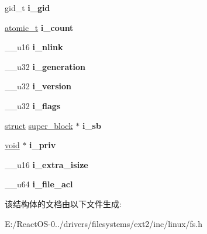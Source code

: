 \begin{DoxyCompactItemize}
\item 
\mbox{\label{structinode_a0c14ee3e0c6392287359562051162885}} 
gid\+\_\+t {\bfseries i\+\_\+gid}
\item 
\mbox{\label{structinode_acdca05fd469ccec646ecffff94ae65bd}} 
\hyperlink{structatomic__t}{atomic\+\_\+t} {\bfseries i\+\_\+count}
\item 
\mbox{\label{structinode_a9342b1b8e60aca78b8ab8a8c99d9259f}} 
\+\_\+\+\_\+u16 {\bfseries i\+\_\+nlink}
\item 
\mbox{\label{structinode_af1c7a9d8594e6a114ab81e265ba8cfa4}} 
\+\_\+\+\_\+u32 {\bfseries i\+\_\+generation}
\item 
\mbox{\label{structinode_a13316e21f7e5f12b934f45e46aa0cf1f}} 
\+\_\+\+\_\+u32 {\bfseries i\+\_\+version}
\item 
\mbox{\label{structinode_a5a6435f6deeed19d84c798ac239293f1}} 
\+\_\+\+\_\+u32 {\bfseries i\+\_\+flags}
\item 
\mbox{\label{structinode_a8e3ca37fd8f709720380afd9f60d0e71}} 
\hyperlink{interfacestruct}{struct} \hyperlink{structsuper__block}{super\+\_\+block} $\ast$ {\bfseries i\+\_\+sb}
\item 
\mbox{\label{structinode_aa4dd5bc49853469c9fc5ea6eeb225e00}} 
\hyperlink{interfacevoid}{void} $\ast$ {\bfseries i\+\_\+priv}
\item 
\mbox{\label{structinode_a4061a12a3878c7b848913a12e2475627}} 
\+\_\+\+\_\+u16 {\bfseries i\+\_\+extra\+\_\+isize}
\item 
\mbox{\label{structinode_a74030322e4d5bf4b10acd3501427f177}} 
\+\_\+\+\_\+u64 {\bfseries i\+\_\+file\+\_\+acl}
\end{DoxyCompactItemize}


该结构体的文档由以下文件生成\+:\begin{DoxyCompactItemize}
\item 
E\+:/\+React\+O\+S-\/0../drivers/filesystems/ext2/inc/linux/fs.\+h\end{DoxyCompactItemize}
